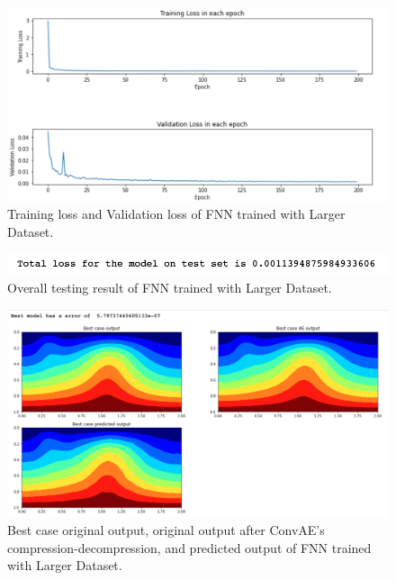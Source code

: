 \begin{figure}[H]
    \caption{Training loss and Validation loss of FNN trained with Larger Dataset.}
    \includegraphics[scale=0.6]{figures/mantle_convection_images/larger_dataset/FNN_trainingData.png}
\end{figure}

\begin{figure}[H]
    \caption{Overall testing result of FNN trained with Larger Dataset.}
    \includegraphics[scale=0.8]{figures/mantle_convection_images/larger_dataset/FNN_OverallTesting.png}
\end{figure}

\begin{figure}[H]
    \caption{Best case original output, original output after ConvAE's compression-decompression, and predicted output of FNN trained with Larger Dataset.}
    \includegraphics[scale=0.5]{figures/mantle_convection_images/larger_dataset/FNN_Best.png}
\end{figure}

